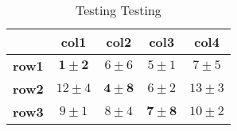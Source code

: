 \documentclass{article}
\begin{document}
\begin{center}

\begin{table}[ht]
\centering
\begin{tabular}
{ |c|c|c|c|c| }
\hline
&\textbf{col1}&\textbf{col2}&\textbf{col3}&\textbf{col4}\\ [0.1ex]
\hline
\textbf{row1}& $\mathbf{1 \pm 2}$ & $6 \pm 6$ & $5 \pm 1$ & $7 \pm 5$ \\ \hline
\textbf{row2}& $12 \pm 4$ & $\mathbf{4 \pm 8}$ & $6 \pm 2$ & $13 \pm 3$ \\ \hline
\textbf{row3}& $9 \pm 1$ & $8 \pm 4$ & $\mathbf{7 \pm 8}$ & $10 \pm 2$ \\ \hline
\end{tabular}
\\[-1.5ex]
\caption{Testing Testing}
\end{table}

\end{center}	
\end{document}
